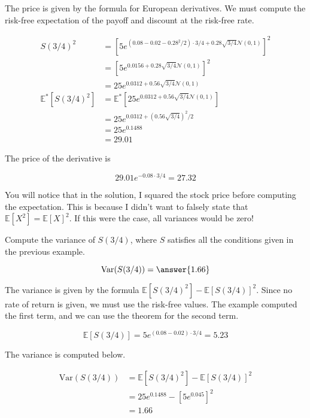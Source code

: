 \documentclass{ximera}
\begin{document}
\begin{solution}
The price is given by the formula for European derivatives. We must compute the risk-free expectation of the payoff and discount at the risk-free rate.

	\begin{align*}
	S(3/4)^2 			&=[5e^{(0.08-0.02-0.28^2/2)\cdot 3/4+0.28\sqrt{3/4}\mathcal{N}(0,1)}]^2\\
					&=[5e^{0.0156+0.28\sqrt{3/4}\mathcal{N}(0,1)}]^2\\
					&=25e^{0.0312+0.56\sqrt{3/4}\mathcal{N}(0,1)}\\
	\mathbb{E}^*[S(3/4)^2] 	&=\mathbb{E}^*[25e^{0.0312+0.56\sqrt{3/4}\mathcal{N}(0,1)}]\\
					&=25e^{0.0312+(0.56\sqrt{3/4})^2/2}\\
					&=25e^{0.1488}\\
					&=29.01
	\end{align*}

The price of the derivative is

	\begin{equation*}
	29.01e^{-0.08\cdot 3/4}=27.32
	\end{equation*}
\end{solution}

You will notice that in the solution, I squared the stock price before computing the expectation. This is because I didn't want to falsely state that $\mathbb{E}[X^2]=\mathbb{E}[X]^2$. If this were the case, all variances would be zero!

\begin{question}
Compute the variance of $S(3/4)$, where $S$ satisfies all the conditions given in the previous example.

	\begin{equation*}
	\text{Var}(S(3/4))=\answer{1.66}
	\end{equation*}
\end{question}

\begin{solution}
The variance is given by the formula $\mathbb{E}[S(3/4)^2]-\mathbb{E}[S(3/4)]^2$. Since no rate of return is given, we must use the risk-free values. The example computed the first term, and we can use the theorem for the second term.

	\begin{equation*}
	\mathbb{E}[S(3/4)]=5e^{(0.08-0.02)\cdot 3/4}=5.23
	\end{equation*}

The variance is computed below.

	\begin{align*}
	\text{Var}(S(3/4)) 	&=\mathbb{E}[S(3/4)^2]-\mathbb{E}[S(3/4)]^2\\
				&=25e^{0.1488}-[5e^{0.045}]^2\\
				&=1.66
	\end{align*}

\end{solution}
\end{document}
